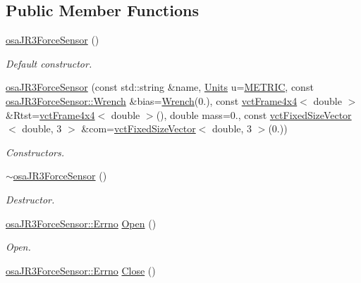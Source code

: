 \subsection*{Public Member Functions}
\begin{DoxyCompactItemize}
\item 
\hyperlink{classosa_j_r3_force_sensor_adc56ae890dde03da65343e7b8618b75b}{osa\+J\+R3\+Force\+Sensor} ()
\begin{DoxyCompactList}\small\item\em Default constructor. \end{DoxyCompactList}\item 
\hyperlink{classosa_j_r3_force_sensor_ad076a77e94576d3946147709a0d2b28f}{osa\+J\+R3\+Force\+Sensor} (const std\+::string \&name, \hyperlink{classosa_j_r3_force_sensor_ac94f1969d4d2089487b912dd0ef7592f}{Units} u=\hyperlink{classosa_j_r3_force_sensor_ac94f1969d4d2089487b912dd0ef7592faf9d1cb83e02904b93520796fff2d9161}{M\+E\+T\+R\+I\+C}, const \hyperlink{classosa_j_r3_force_sensor_afcfc2ba175b2e7ef9f86c6394c8966d2}{osa\+J\+R3\+Force\+Sensor\+::\+Wrench} \&bias=\hyperlink{classosa_j_r3_force_sensor_afcfc2ba175b2e7ef9f86c6394c8966d2}{Wrench}(0.), const \hyperlink{classvct_frame4x4}{vct\+Frame4x4}$<$ double $>$ \&Rtst=\hyperlink{classvct_frame4x4}{vct\+Frame4x4}$<$ double $>$(), double mass=0., const \hyperlink{classvct_fixed_size_vector}{vct\+Fixed\+Size\+Vector}$<$ double, 3 $>$ \&com=\hyperlink{classvct_fixed_size_vector}{vct\+Fixed\+Size\+Vector}$<$ double, 3 $>$(0.))
\begin{DoxyCompactList}\small\item\em Constructors. \end{DoxyCompactList}\item 
\hyperlink{classosa_j_r3_force_sensor_abf994dcb084fab254ebe1bd5e90660dc}{$\sim$osa\+J\+R3\+Force\+Sensor} ()
\begin{DoxyCompactList}\small\item\em Destructor. \end{DoxyCompactList}\item 
\hyperlink{classosa_j_r3_force_sensor_a6b27d3a601fae1547fb13d2a4ef97e4a}{osa\+J\+R3\+Force\+Sensor\+::\+Errno} \hyperlink{classosa_j_r3_force_sensor_a87d5fcf202b615b380fc2ca07377b447}{Open} ()
\begin{DoxyCompactList}\small\item\em Open. \end{DoxyCompactList}\item 
\hyperlink{classosa_j_r3_force_sensor_a6b27d3a601fae1547fb13d2a4ef97e4a}{osa\+J\+R3\+Force\+Sensor\+::\+Errno} \hyperlink{classosa_j_r3_force_sensor_a90e05e652d0cff51df2d065b28eb4d70}{Close} ()

\end{DoxyCompactItemize}
